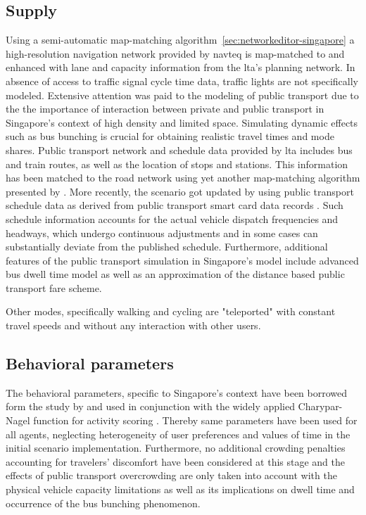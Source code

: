 \subsection{Supply}
Using a semi-automatic map-matching algorithm~\ref{sec:networkeditor-singapore} a high-resolution navigation network provided by \gls{navteq} is map-matched to and enhanced with lane and capacity information from the \gls{lta}'s planning network. In absence of access to traffic signal cycle time data, traffic lights are not specifically modeled. Extensive attention was paid to the modeling of public transport due to the the importance of interaction between private and public transport in Singapore’s context of high density and limited space. Simulating dynamic effects such as bus bunching is crucial for obtaining realistic travel times and mode shares. Public transport network and schedule data provided by \gls{lta} includes bus and train routes, as well as the location of stops and stations. This information has been matched to the road network using yet another map-matching algorithm presented by \citet[][]{Ordonez_HKSTS_2011, Ordonez_Webpage_2011_4}. More recently, the scenario got updated by using public transport schedule data as derived from public transport smart card data records \citet[][]{Fourie_TechRep_FCL_2014}. Such schedule information accounts for the actual vehicle dispatch frequencies and headways, which undergo continuous adjustments and in some cases can substantially deviate from the published schedule. Furthermore, additional features of the public transport simulation in Singapore’s model include advanced bus dwell time model \citep[][]{SunEtAl_TransResA_2014} as well as an approximation of the distance based public transport fare scheme.

Other modes, specifically walking and cycling are "teleported" with constant travel speeds and without any interaction with other users. 

\subsection{Behavioral parameters}
The behavioral parameters, specific to Singapore's context have been borrowed form the study by \citet[][]{LTA_unpub_2009} and used in conjunction with the widely applied Charypar-Nagel function for activity scoring \citet[][]{CharyparNagel2005ga4acts}. Thereby same parameters have been used for all agents, neglecting heterogeneity of user preferences and values of time in the initial scenario implementation. Furthermore, no additional crowding penalties accounting for travelers' discomfort have been considered at this stage and the effects of public transport overcrowding are only taken into account with the physical vehicle capacity limitations as well as its implications on dwell time and occurrence of the bus bunching phenomenon. 

